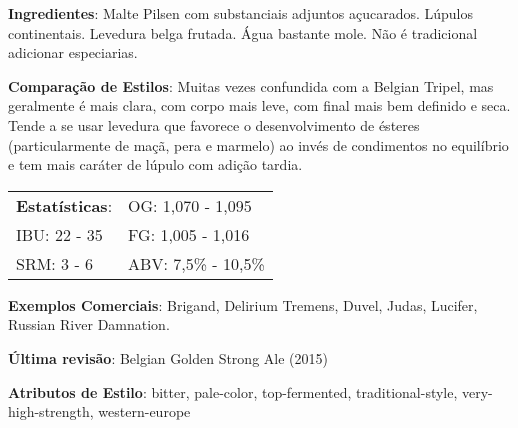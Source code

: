 \textbf{Ingredientes}: Malte Pilsen com substanciais adjuntos açucarados. Lúpulos continentais. Levedura belga frutada. Água bastante mole. Não é tradicional adicionar especiarias.

\textbf{Comparação de Estilos}: Muitas vezes confundida com a Belgian Tripel, mas geralmente é mais clara, com corpo mais leve, com final mais bem definido e seca. Tende a se usar levedura que favorece o desenvolvimento de ésteres (particularmente de maçã, pera e marmelo) ao invés de condimentos no equilíbrio e tem mais caráter de lúpulo com adição tardia.

\begin{tabular}{@{}p{35mm}p{35mm}@{}}
  \textbf{Estatísticas}: & OG: 1,070 - 1,095  \\
  IBU: 22 - 35  & FG: 1,005 - 1,016   \\
  SRM: 3 - 6 & ABV: 7,5\% - 10,5\%
\end{tabular}

\textbf{Exemplos Comerciais}: Brigand, Delirium Tremens, Duvel, Judas, Lucifer, Russian River Damnation.

\textbf{Última revisão}: Belgian Golden Strong Ale (2015)

\textbf{Atributos de Estilo}: bitter, pale-color, top-fermented, traditional-style, very-high-strength, western-europe
